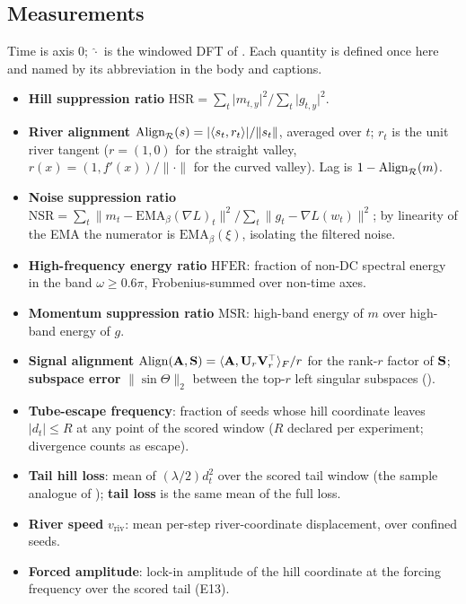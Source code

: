\documentclass[11pt,a4paper]{article}
\theoremstyle{remark}
\newcommand{\Align}{\mathrm{Align}}
\newcommand{\vriv}{v_{\mathrm{riv}}}
\begin{document}
\subsection{Measurements}
\label{sec:measurements}
Time is axis $0$; $\hat\cdot$ is the windowed DFT of .
Each quantity is defined once here and named by its abbreviation in the body and captions.
\begin{itemize}
\item \textbf{Hill suppression ratio} $\mathrm{HSR}=\sum_t\lvert m_{t,y}\rvert^2/\sum_t\lvert g_{t,y}\rvert^2$.
\item \textbf{River alignment} $\Align_\Rcal(s)=\lvert\langle s_t,r_t\rangle\rvert/\lVert s_t\rVert$, averaged over $t$; $r_t$ is the unit river tangent ($r=(1,0)$ for the straight valley, $r(x)=(1,f'(x))/\lVert\cdot\rVert$ for the curved valley).
Lag is $1-\Align_\Rcal(m)$.
\item \textbf{Noise suppression ratio} $\mathrm{NSR}=\sum_t\lVert m_t-\mathrm{EMA}_\beta(\nabla L)_t\rVert^2/\sum_t\lVert g_t-\nabla L(w_t)\rVert^2$; by linearity of the EMA the numerator is $\mathrm{EMA}_\beta(\xi)$, isolating the filtered noise.
\item \textbf{High-frequency energy ratio} $\mathrm{HFER}$: fraction of non-DC spectral energy in the band $\omega\ge0.6\pi$, Frobenius-summed over non-time axes.
\item \textbf{Momentum suppression ratio} $\mathrm{MSR}$: high-band energy of $m$ over high-band energy of $g$.
\item \textbf{Signal alignment} $\Align(\Abf,\Sbf)=\langle\Abf,\Ubf_r\Vbf_r^\top\rangle_F/r$ for the rank-$r$ factor of $\mathbf{S}$; \textbf{subspace error} $\lVert\sin\Theta\rVert_2$ between the top-$r$ left singular subspaces ().
\item \textbf{Tube-escape frequency}: fraction of seeds whose hill coordinate leaves $\lvert d_t\rvert\le R$ at any point of the scored window ($R$ declared per experiment; divergence counts as escape).
\item \textbf{Tail hill loss}: mean of $(\lambda/2)d_t^2$ over the scored tail window (the sample analogue of ); \textbf{tail loss} is the same mean of the full loss.
\item \textbf{River speed} $\vriv$: mean per-step river-coordinate displacement, over confined seeds.
\item \textbf{Forced amplitude}: lock-in amplitude of the hill coordinate at the forcing frequency over the scored tail (E13).

\end{itemize}
\end{document}
